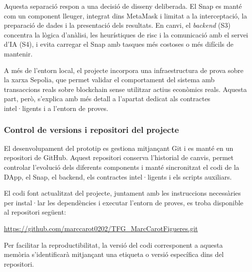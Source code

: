 Aquesta separació respon a una decisió de disseny deliberada. El Snap es manté com un component lleuger, integrat dins MetaMask i limitat a la interceptació, la preparació de dades i la presentació dels resultats. En canvi, el \textit{backend} (S3) concentra la lògica d’anàlisi, les heurístiques de risc i la comunicació amb el servei d’IA (S4), i evita carregar el Snap amb tasques més costoses o més difícils de mantenir.

A més de l’entorn local, el projecte incorpora una infraestructura de prova sobre la xarxa Sepolia, que permet validar el comportament del sistema amb transaccions reals sobre blockchain sense utilitzar actius econòmics reals. Aquesta part, però, s’explica amb més detall a l’apartat dedicat als contractes intel·ligents i a l’entorn de proves.


\subsubsection{Control de versions i repositori del projecte}

El desenvolupament del prototip es gestiona mitjançant Git i es manté en un repositori de GitHub. Aquest repositori conserva l’historial de canvis, permet controlar l’evolució dels diferents components i manté sincronitzat el codi de la DApp, el Snap, el backend, els contractes intel·ligents i els scripts auxiliars.

El codi font actualitzat del projecte, juntament amb les instruccions necessàries per instal·lar les dependències i executar l’entorn de proves, es troba disponible al repositori següent:

\begin{center}
\url{https://github.com/marccarot0202/TFG_MarcCarotFigueres.git}
\end{center}

Per facilitar la reproductibilitat, la versió del codi corresponent a aquesta memòria s’identificarà mitjançant una etiqueta o versió específica dins del repositori.


